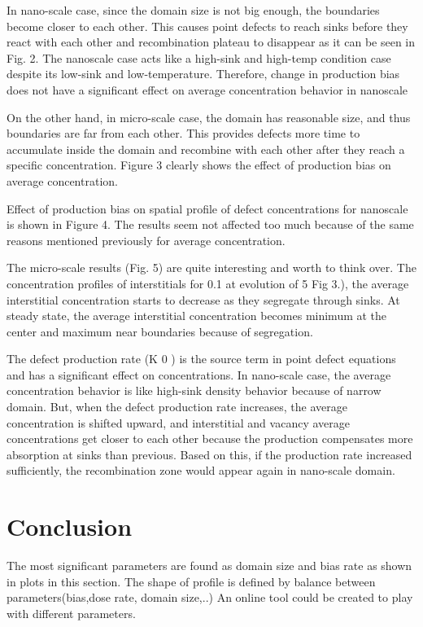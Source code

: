 \documentclass[a4paper]{article}
\begin{document}
In nano-scale case, since the domain size is not big enough, the boundaries become
closer to each other. This causes point defects to reach sinks before they react with each other
and recombination plateau to disappear as it can be seen in Fig. 2. The nanoscale case acts like
a high-sink and high-temp condition case despite its low-sink and low-temperature. Therefore,
change in production bias does not have a significant effect on average concentration behavior
in nanoscale

On the other hand, in micro-scale case, the domain has reasonable size, and thus
boundaries are far from each other. This provides defects more time to accumulate inside the
domain and recombine with each other after they reach a specific concentration. Figure 3
clearly shows the effect of production bias on average concentration.

Effect of production bias on spatial profile of defect concentrations for nanoscale is
shown in Figure 4. The results seem not affected too much because of the same reasons
mentioned previously for average concentration.

The micro-scale results (Fig. 5) are quite interesting and worth to think over. The
concentration profiles of interstitials for 0.1%
at evolution of 5%
Fig 3.), the average interstitial concentration starts to decrease as they segregate through sinks.
At steady state, the average interstitial concentration becomes minimum at the center and
maximum near boundaries because of segregation.

The defect production rate (K 0 ) is the source term in point defect equations and has a
significant effect on concentrations.
In nano-scale case, the average concentration behavior is like high-sink density behavior
because of narrow domain. But, when the defect production rate increases, the average
concentration is shifted upward, and interstitial and vacancy average concentrations get closer
to each other because the production compensates more absorption at sinks than previous.
Based on this, if the production rate increased sufficiently, the recombination zone would
appear again in nano-scale domain.\cite{was2016}

\section{Conclusion} \hspace{10pt}

The most significant parameters are found as domain size and bias rate as shown in plots in this section.
The shape of profile is defined by balance between parameters(bias,dose rate, domain size,..)
An online tool could be created to play with different parameters.


\end{document}
